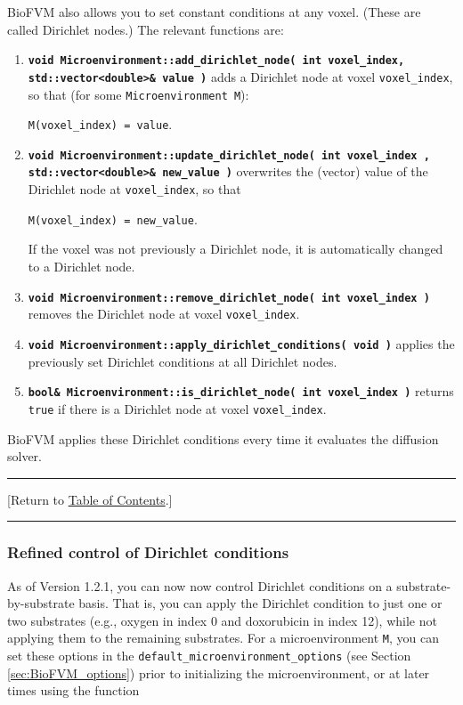 \documentclass[12pt]{article}
\renewcommand{\v}{\verb}
\newcommand{\smallcode}[1]{\textbf{\texttt{#1}}}
\newcommand{\TOClink}{\begin{center}\hrule\vskip-10pt\phantom{.}\hfill[Return to \hyperlink{TOC}{Table of Contents}.]\hfill\phantom{.}\vskip3pt\hrule\end{center}}
\begin{document}
BioFVM also allows you to set constant conditions at any 
voxel. (These are called Dirichlet nodes.) The relevant functions 
are: 

\begin{enumerate}
\item 
\smallcode{void Microenvironment::add\_dirichlet\_node( int voxel\_index, \\
\phantom{void } std::vector<double>\& value )} adds a Dirichlet node at voxel \v|voxel_index|, so that (for some \v|Microenvironment M|):

\v|M(voxel_index) = value|. 

\item 
\smallcode{void Microenvironment::update\_dirichlet\_node( int voxel\_index ,
 \\ \phantom{void }std::vector<double>\& new\_value )} overwrites the (vector) 
 value of the Dirichlet node at \v|voxel_index|, so that 

\v|M(voxel_index) = new_value|.  

If the voxel was not previously a Dirichlet node, it is automatically 
changed to a Dirichlet node. 

\item 
\smallcode{void Microenvironment::remove\_dirichlet\_node( int voxel\_index )} 
removes the Dirichlet node at voxel \v|voxel_index|. 

\item 
\smallcode{void Microenvironment::apply\_dirichlet\_conditions( void )} 
applies the previously set Dirichlet conditions at all Dirichlet nodes. 

\item
\smallcode{bool\& Microenvironment::is\_dirichlet\_node( int voxel\_index )} 
returns \v|true| if there is a Dirichlet node at voxel 
\v|voxel_index|. 
\end{enumerate}
 
BioFVM applies these Dirichlet conditions every time it 
evaluates the diffusion solver.

\TOClink

\subsubsection{Refined control of Dirichlet conditions}
\label{sec:refined_Dirichlet_conditions}

As of Version 1.2.1, you can now now control Dirichlet conditions on a 
substrate-by-substrate basis. That is, you can apply the Dirichlet condition to just one or two 
substrates (e.g., oxygen in index 0 and doxorubicin in index 12), while not applying them 
to the remaining substrates. For a microenvironment \v|M|, you can set these options 
in the \v|default_microenvironment_options| (see Section \ref{sec:BioFVM_options}) prior to initializing 
the microenvironment, or at later times using the function 
\end{document}
